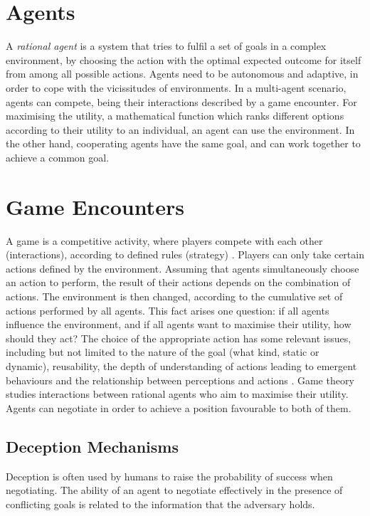 \section{Agents}
A \textit{rational agent} is a system that tries to fulfil a set of goals in a complex environment, by choosing the action with the optimal expected outcome for itself from among all possible actions. Agents need to be autonomous and adaptive, in order to cope with the vicissitudes of environments. In a multi-agent scenario, agents can compete, being their interactions described by a game encounter. For maximising the utility, a mathematical function which ranks different options according to their utility to an individual, an agent can use the environment. In the other hand, cooperating agents have the same goal, and can work together to achieve a common goal. 
\section{Game Encounters}
A game is a competitive activity, where players compete with each other (interactions), according to defined rules (strategy) \cite{aulas}
. Players can only take certain actions defined by the environment.  Assuming that agents simultaneously choose an action to perform, the result of their actions depends on the combination of actions. The environment is then changed, according to the cumulative set of actions performed by all agents. This fact arises one question: if all agents influence the environment, and if all agents want to maximise their utility, how should they act? The choice of the appropriate action has some relevant issues, including but not limited to the nature of the goal (what kind, static or dynamic), reusability, the depth of understanding of actions leading to emergent behaviours and the relationship between perceptions and actions \cite{Maes:1993:MAA:1668014.1668022}. Game theory studies interactions between rational agents who aim to maximise their utility. Agents can negotiate in order to achieve a position favourable to both of them. 

\subsection{Deception Mechanisms}
Deception is often used by humans to raise the probability of success when negotiating. The ability of an agent to negotiate effectively in the presence of conflicting goals is related to the information that the adversary holds. 

